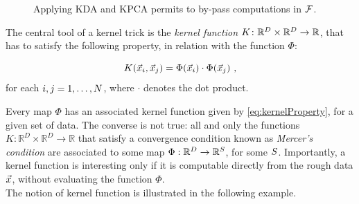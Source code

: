 \begin{figure}
\centering
{
}
\caption{Applying KDA and KPCA permits to by-pass computations in $\mathcal{F}$.}\label{fig:scheme2}
\end{figure}

The central tool of a kernel trick is the \emph{kernel function} $K \colon \mathbb{R}^D \times \mathbb{R}^D \rightarrow \mathbb{R}$, that has to satisfy the following property, in relation with the function $\Phi$:

\begin{equation}\label{eq:kernelProperty}
K(\vec{x}_i,\vec{x}_j) = \Phi(\vec{x}_i)\cdot \Phi(\vec{x}_j) \mbox{ ,}
\end{equation}
for each $i,j= 1,\dots, N$, where $\cdot$ denotes the dot product.


Every map $\Phi$ has an associated kernel function given by \eqref{eq:kernelProperty}, for a given set of data. The converse is not true: all and only the functions $K\colon\mathbb{R}^D\times \mathbb{R}^D \rightarrow \mathbb{R}$ that satisfy a convergence condition known as {\em Mercer's condition} are associated to some map $\Phi:\mathbb{R}^D	\rightarrow \mathbb{R}^S$, for some $S$. Importantly, a kernel function is interesting only if it is computable directly from the rough data $\vec{x}$, without evaluating the function $\Phi$. \\

The notion of kernel function is illustrated in the following example.

